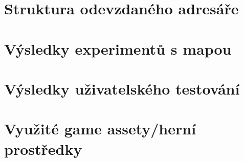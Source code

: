 
%






\chapter{Struktura odevzdaného adresáře}\label{chap:file_directory}

\chapter{Výsledky experimentů s mapou}\label{chap:map_experiments}

\chapter{Výsledky uživatelského testování}\label{chap:user_testing}

\chapter{Využité game assety/herní prostředky}\label{chap:game_assets}
%
